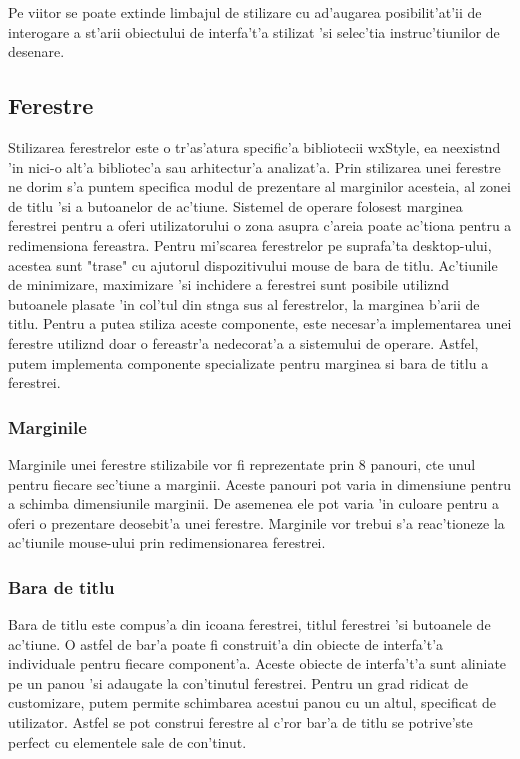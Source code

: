 \medskip

Pe viitor se poate extinde limbajul de stilizare cu ad'augarea posibilit'at'ii de interogare a st'arii obiectului de interfa't'a stilizat 'si selec'tia instruc'tiunilor de desenare.

\subsection{Ferestre}

Stilizarea ferestrelor este o tr'as'atura specific'a bibliotecii wxStyle, ea neexist{\ia}nd 'in nici-o alt'a bibliotec'a sau arhitectur'a analizat'a. Prin stilizarea unei ferestre ne dorim s'a puntem specifica modul de prezentare al marginilor acesteia, al zonei de titlu 'si a butoanelor de ac'tiune. Sistemel de operare folosest marginea ferestrei pentru a oferi utilizatorului o zona asupra c'areia poate ac'tiona pentru a redimensiona fereastra. Pentru mi'scarea ferestrelor pe suprafa'ta desktop-ului, acestea sunt "trase" cu ajutorul dispozitivului mouse de bara de titlu. Ac'tiunile de minimizare, maximizare 'si inchidere a ferestrei sunt posibile utiliz{\ia}nd butoanele plasate 'in col'tul din st{\ia}nga sus al ferestrelor, la marginea b'arii de titlu. Pentru a putea stiliza aceste componente, este necesar'a implementarea unei ferestre utiliz{\ia}nd doar o fereastr'a nedecorat'a a sistemului de operare. Astfel, putem implementa componente specializate pentru marginea si bara de titlu a ferestrei.

\subsubsection{Marginile}

Marginile unei ferestre stilizabile vor fi reprezentate prin 8 panouri, c{\ia}te unul pentru fiecare sec'tiune a marginii. Aceste panouri pot varia in dimensiune pentru a schimba dimensiunile marginii. De asemenea ele pot varia 'in culoare pentru a oferi o prezentare deosebit'a unei ferestre. Marginile vor trebui s'a reac'tioneze la ac'tiunile mouse-ului prin redimensionarea ferestrei.

\subsubsection{Bara de  titlu}

Bara de titlu este compus'a din icoana ferestrei, titlul ferestrei 'si butoanele de ac'tiune. O astfel de bar'a poate fi construit'a din obiecte de interfa't'a individuale pentru fiecare component'a. Aceste obiecte de interfa't'a sunt aliniate pe un panou 'si adaugate la con'tinutul ferestrei. Pentru un grad ridicat de customizare, putem permite schimbarea acestui panou cu un altul, specificat de utilizator. Astfel se pot construi ferestre al c'ror bar'a de titlu se potrive'ste perfect cu elementele sale de con'tinut.

